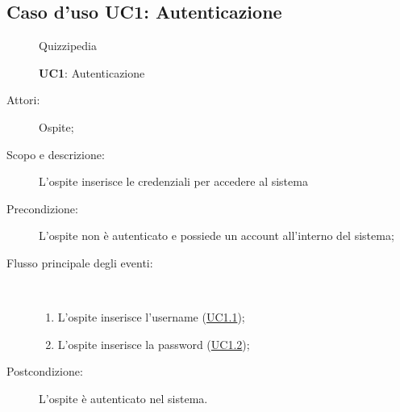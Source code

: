 \hypertarget{UC1}{}
\subsection{Caso d'uso UC1: Autenticazione}
	\begin{figure}[H]
		\centering
		\begin{resizedtikzpicture}{\textwidth}
		\begin{umlsystem}[x=0, fill=lightgray!20]{Quizzipedia}
		\end{umlsystem}
		\end{resizedtikzpicture}
		\caption{\textbf{UC1}: Autenticazione}
		\label{UC1}
	\end{figure}
\begin{description}
\item[Attori:] Ospite;
\item[Scopo e descrizione:] L'ospite inserisce le credenziali per accedere al sistema
      \item[Precondizione:] L'ospite non è autenticato e possiede un account all'interno del sistema;

        \item[Flusso principale degli eventi:] \ 
 \begin{enumerate}
          \item L'ospite inserisce l'username (\hyperlink{UC1.1}{UC1.1});
          \item L'ospite inserisce la password (\hyperlink{UC1.2}{UC1.2});

      \end{enumerate}
    \item[Postcondizione:] L’ospite è autenticato nel sistema.
  \end{description}
\hypertarget{UC1.1}{}
